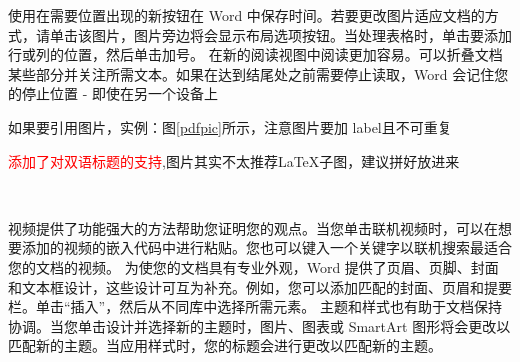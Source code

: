 使用在需要位置出现的新按钮在 Word 中保存时间。若要更改图片适应文档的方式，请单击该图片，图片旁边将会显示布局选项按钮。当处理表格时，单击要添加行或列的位置，然后单击加号。
在新的阅读视图中阅读更加容易。可以折叠文档某些部分并关注所需文本。如果在达到结尾处之前需要停止读取，Word 会记住您的停止位置 - 即使在另一个设备上

如果要引用图片，实例：图\ref{pdfpic}所示，注意图片要加 label且不可重复

\textcolor{red}{添加了对双语标题的支持},图片其实不太推荐\LaTeX 子图，建议拼好放进来

\begin{figure}[H]
\centering
{}
\\
\hspace{3cm}

\label{fig:binaural_recording}
\end{figure}

视频提供了功能强大的方法帮助您证明您的观点。当您单击联机视频时，可以在想要添加的视频的嵌入代码中进行粘贴。您也可以键入一个关键字以联机搜索最适合您的文档的视频。
为使您的文档具有专业外观，Word 提供了页眉、页脚、封面和文本框设计，这些设计可互为补充。例如，您可以添加匹配的封面、页眉和提要栏。单击“插入”，然后从不同库中选择所需元素。
主题和样式也有助于文档保持协调。当您单击设计并选择新的主题时，图片、图表或 SmartArt 图形将会更改以匹配新的主题。当应用样式时，您的标题会进行更改以匹配新的主题。

